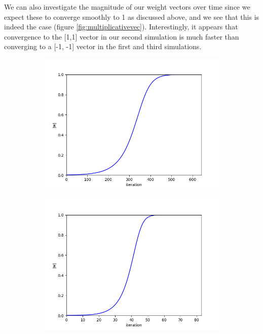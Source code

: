 \documentclass{article}
\begin{document}
We can also investigate the magnitude of our weight vectors over time since we expect these to converge smoothly to 1 as discussed above, and we see that this is indeed the case (figure \ref{fig:multiplicativevec}). Interestingly, it appears that convergence to the [1,1] vector in our second simulation is much faster than converging to a [-1, -1] vector in the first and third simulations.

\begin{figure}[h]
	\centering
	\begin{subfigure}[t]{0.30\linewidth}
		\centering
		\includegraphics[width = 1.0\linewidth, trim={0 0 0 0}, clip=true]{figures/2d_sim1_vec.png}
		\subcaption{}
		\label{fig:sim1vec}	
	\end{subfigure}%
	\hspace{0.03\linewidth}
	\begin{subfigure}[t]{0.30\linewidth}
		\centering
		\includegraphics[width = 1.0\linewidth, trim={0 0 0 0}, clip=true]{figures/2d_sim2_vec.png}

\end{subfigure}
\end{figure}
\end{document}
